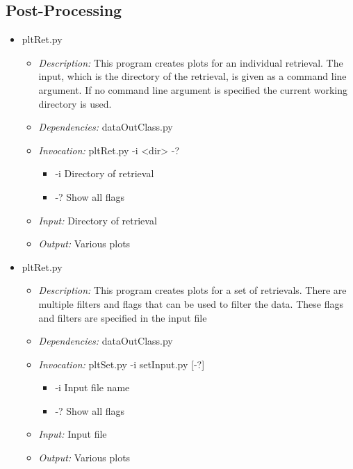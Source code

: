\documentclass[12pt, letterpaper]{article}
\begin{document}
\subsection{Post-Processing}
\begin{itemize}
\item pltRet.py
\begin{itemize}
\item \textit{Description:} This program creates plots for an individual retrieval. The input, which is the directory of the retrieval, is given as a command line argument. If no command line argument is specified the current working directory is used.
\item \textit{Dependencies:} dataOutClass.py
\item \textit{Invocation:} pltRet.py -i <dir> -?
\begin{itemize}
\item -i Directory of retrieval
\item -? Show all flags
\end{itemize}
\item \textit{Input:} Directory of retrieval
\item \textit{Output:} Various plots
\end{itemize}
\end{itemize}

\begin{itemize}
\item pltRet.py
\begin{itemize}
\item \textit{Description:} This program creates plots for a set of retrievals. There are multiple filters and flags that can be used to filter the data. These flags and filters are specified in the input file
\item \textit{Dependencies:} dataOutClass.py
\item \textit{Invocation:} pltSet.py -i setInput.py [-?]
\begin{itemize}
\item -i Input file name
\item -? Show all flags
\end{itemize}
\item \textit{Input:} Input file
\item \textit{Output:} Various plots
\end{itemize}
\end{itemize}
\end{document}
